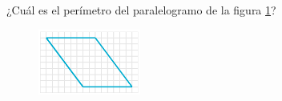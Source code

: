 \question[25]  ¿Cuál es el perímetro del paralelogramo de la figura \ref{fig:peri_paralelogramo_02}?
\begin{figure}[H]
    \begin{center}
        \includegraphics[width=0.3\textwidth]{../images/peri_paralelogramo_02.png}
    \end{center}
    \caption{}
    \label{fig:peri_paralelogramo_02}
\end{figure}